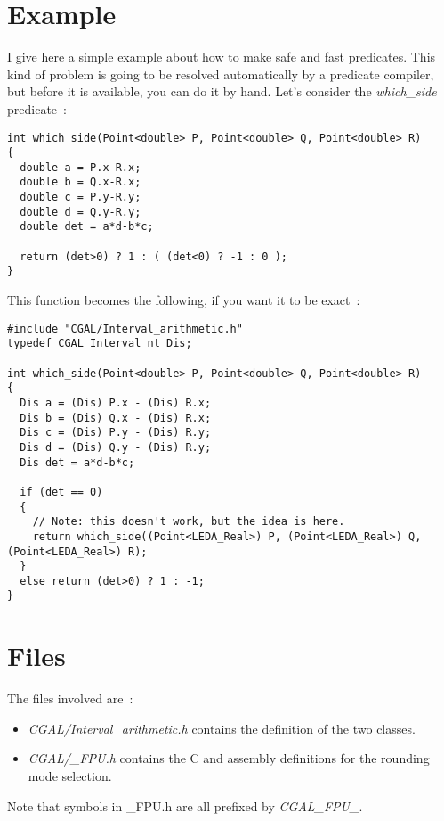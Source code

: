 \section{Example}

I give here a simple example about how to make safe and fast predicates.
This kind of problem is going to be resolved automatically by a predicate
compiler, but before it is available, you can do it by hand.
Let's consider the {\it which\_side} predicate~:

\begin{verbatim}
int which_side(Point<double> P, Point<double> Q, Point<double> R)
{
  double a = P.x-R.x;
  double b = Q.x-R.x;
  double c = P.y-R.y;
  double d = Q.y-R.y;
  double det = a*d-b*c;

  return (det>0) ? 1 : ( (det<0) ? -1 : 0 );
}
\end{verbatim}

This function becomes the following, if you want it to be exact~:

\begin{verbatim}
#include "CGAL/Interval_arithmetic.h"
typedef CGAL_Interval_nt Dis;

int which_side(Point<double> P, Point<double> Q, Point<double> R)
{
  Dis a = (Dis) P.x - (Dis) R.x;
  Dis b = (Dis) Q.x - (Dis) R.x;
  Dis c = (Dis) P.y - (Dis) R.y;
  Dis d = (Dis) Q.y - (Dis) R.y;
  Dis det = a*d-b*c;

  if (det == 0)
  {
    // Note: this doesn't work, but the idea is here.
    return which_side((Point<LEDA_Real>) P, (Point<LEDA_Real>) Q, (Point<LEDA_Real>) R);
  }
  else return (det>0) ? 1 : -1;
}
\end{verbatim}


\section{Files}

The files involved are~:
\begin{itemize}
\item {\it CGAL/Interval\_arithmetic.h} contains the definition of the
      two classes.
\item {\it CGAL/\_FPU.h} contains the C and assembly definitions for the
      rounding mode selection.
\end{itemize}

\bigskip

Note that symbols in \_FPU.h are all prefixed by {\it CGAL\_FPU\_}.
